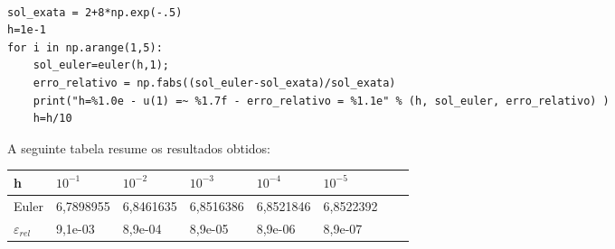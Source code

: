 \begin{resol}
\begin{verbatim}
	
sol_exata = 2+8*np.exp(-.5)
h=1e-1
for i in np.arange(1,5):
	sol_euler=euler(h,1);
	erro_relativo = np.fabs((sol_euler-sol_exata)/sol_exata)
	print("h=%1.0e - u(1) =~ %1.7f - erro_relativo = %1.1e" % (h, sol_euler, erro_relativo) )
	h=h/10
\end{verbatim}
\fi
A seguinte tabela resume os resultados obtidos:
\begin{center}
 \begin{tabular}{|l|l|l|l|l|l|l|l|}%
\hline
   h&$10^{-1}$&$10^{-2}$&$10^{-3}$&$10^{-4}$&$10^{-5}$\\
   \hline
  Euler & 6,7898955 &  6,8461635  &  6,8516386  &  6,8521846  &  6,8522392  \\
   \hline
   $\varepsilon_{rel}$ &9,1e-03 &  8,9e-04  & 8,9e-05&   8,9e-06 &  8,9e-07\\
    \hline
  \end{tabular}
\end{center}



\end{resol}


